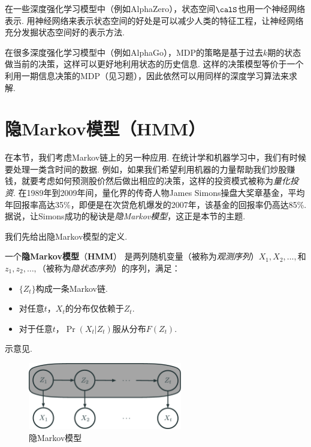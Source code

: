 在一些深度强化学习模型中（例如AlphaZero），状态空间$\calS$也用一个神经网络表示. 用神经网络来表示状态空间的好处是可以减少人类的特征工程，让神经网络充分发掘状态空间好的表示方法.

在很多深度强化学习模型中（例如AlphaGo），MDP的策略是基于过去$k$期的状态做当前的决策，这样可以更好地利用状态的历史信息. 这样的决策模型等价于一个利用一期信息决策的MDP（见习题），因此依然可以用同样的深度学习算法来求解. 


\section{隐Markov模型（HMM）}\label{sec:HMM}

在本节，我们考虑Markov链上的另一种应用. 在统计学和机器学习中，我们有时候要处理一类含时间的数据. 例如，如果我们希望利用机器的力量帮助我们炒股赚钱，就要考虑如何预测股价然后做出相应的决策，这样的投资模式被称为\emph{量化投资}. 在1989年到2009年间，量化界的传奇人物James Simons操盘大奖章基金，平均年回报率高达35\%，即便是在次贷危机爆发的2007年，该基金的回报率仍高达85\%. 据说，让Simons成功的秘诀是\emph{隐Markov模型}，这正是本节的主题.

我们先给出隐Markov模型的定义. 

\begin{definition}
一个\textbf{隐Markov模型}（\textbf{HMM}） 是两列随机变量（被称为\emph{观测序列}）$X_1,X_2,\dots,$和$z_1,z_2,\dots,$（被称为\emph{隐状态序列}）的序列，满足：
    \begin{itemize}
        \item $\{Z_t\}$构成一条Markov链.
        \item 对任意$t$，$X_t$的分布仅依赖于$Z_t$.
        \item 对于任意$t$，$\Pr(X_t|Z_t)$服从分布$F(Z_t)$.
    \end{itemize}
\end{definition}
示意见.
\begin{figure}[ht]
    \centering
    \includegraphics[width=0.6\textwidth]{Figures/Markov-chain/HMM.eps}
    \caption{隐Markov模型}
    \label{fig:HMM}
\end{figure}    


